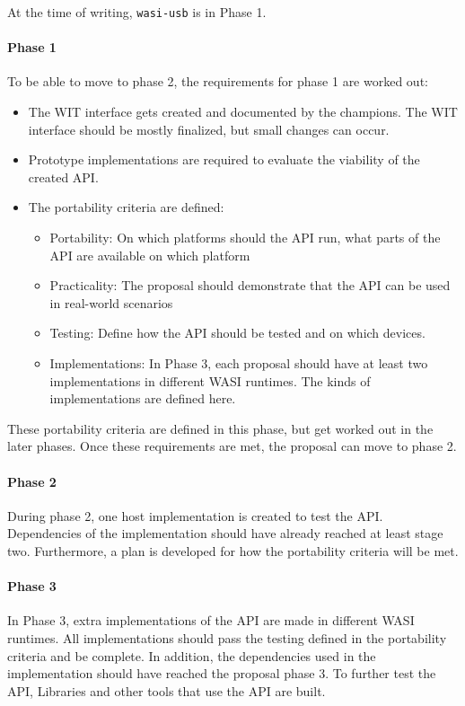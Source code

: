 At the time of writing, \texttt{wasi-usb} is in Phase 1.

\paragraph{Phase 1}
To be able to move to phase 2, the requirements for phase 1 are worked out:
\begin{itemize}
\item The WIT interface gets created and documented by the champions. The WIT interface should be mostly finalized, but small changes can occur.
\item Prototype implementations are required to evaluate the viability of the created API.
\item The portability criteria are defined:
\begin{itemize}
\item Portability: On which platforms should the API run, what parts of the API are available on which platform
\item Practicality: The proposal should demonstrate that the API can be used in real-world scenarios
\item Testing: Define how the API should be tested and on which devices.
\item Implementations: In Phase 3, each proposal should have at least two implementations in different WASI runtimes. The kinds of implementations are defined here.
\end{itemize}
\end{itemize}

These portability criteria are defined in this phase, but get worked out in the later phases.
Once these requirements are met, the proposal can move to phase 2.

\paragraph{Phase 2}
During phase 2, one host implementation is created to test the API. Dependencies of the implementation should have already reached at least stage two.
Furthermore, a plan is developed for how the portability criteria will be met.

\paragraph{Phase 3}
In Phase 3, extra implementations of the API are made in different WASI runtimes. All implementations should pass the testing defined in the portability criteria and be complete. In addition, the dependencies used in the implementation should have reached the proposal phase 3. To further test the API, Libraries and other tools that use the API are built.

